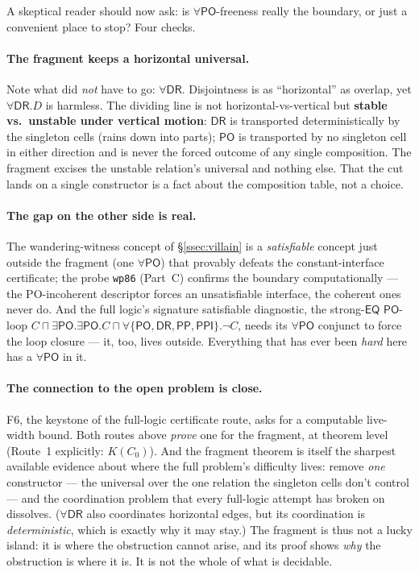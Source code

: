 \documentclass[11pt]{article}
\newcommand{\DR}{\ensuremath{\mathsf{DR}}}
\newcommand{\PO}{\ensuremath{\mathsf{PO}}}
\newcommand{\PP}{\ensuremath{\mathsf{PP}}}
\newcommand{\PPI}{\ensuremath{\mathsf{PPI}}}
\newcommand{\EQ}{\ensuremath{\mathsf{EQ}}}
\newcommand{\code}[1]{\texttt{#1}}
\begin{document}
A skeptical reader should now ask: is $\forall\PO$-freeness really the
boundary, or just a convenient place to stop? Four checks.

\paragraph{The fragment keeps a horizontal universal.} Note what did
\emph{not} have to go: $\forall\DR$. Disjointness is as ``horizontal''
as overlap, yet $\forall\DR.D$ is harmless. The dividing line is not
horizontal-vs-vertical but \textbf{stable vs.\ unstable under vertical
motion}: $\DR$ is transported deterministically by the singleton cells
(rains down into parts); $\PO$ is transported by no singleton cell in
either direction and is never the forced outcome of any single
composition. The fragment excises the unstable relation's universal and
nothing else. That the cut lands on a single constructor is a fact
about the composition table, not a choice.

\paragraph{The gap on the other side is real.} The wandering-witness
concept of \S\ref{ssec:villain} is a \emph{satisfiable} concept just
outside the fragment (one $\forall\PO$) that provably defeats the
constant-interface certificate; the probe \code{wp86} (Part~C) confirms
the boundary computationally --- the PO-incoherent descriptor forces an
unsatisfiable interface, the coherent ones never do. And the full
logic's signature satisfiable diagnostic, the strong-$\EQ$ $\PO$-loop
$C\sqcap\exists\PO.\exists\PO.C\sqcap\forall\{\PO,\DR,\PP,\PPI\}.\neg C$,
needs its $\forall\PO$ conjunct to force the loop closure --- it, too,
lives outside. Everything that has ever been \emph{hard} here has a
$\forall\PO$ in it.

\paragraph{The connection to the open problem is close.} F6, the keystone
of the full-logic certificate route, asks for a computable live-width bound.
Both routes above \emph{prove} one for the fragment, at theorem level
(Route~1 explicitly: $K(C_0)$). And
the fragment theorem is itself the sharpest available evidence about
where the full problem's difficulty lives: remove \emph{one}
constructor --- the universal over the one relation the singleton cells
don't control --- and the coordination problem that every full-logic
attempt has broken on dissolves. ($\forall\DR$ also coordinates
horizontal edges, but its coordination is \emph{deterministic}, which
is exactly why it may stay.) The fragment is thus not a lucky island:
it is where the obstruction cannot arise, and its proof shows \emph{why}
the obstruction is where it is. It is not the whole of what is decidable.
\end{document}
